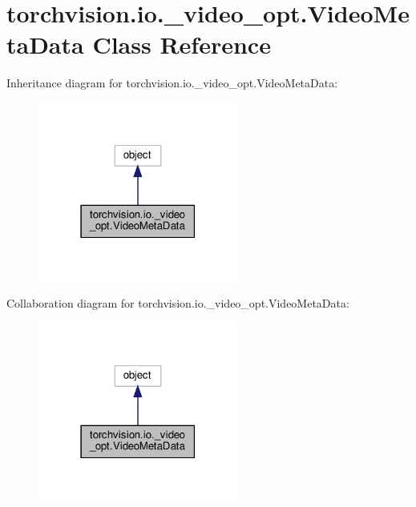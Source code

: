 \hypertarget{classtorchvision_1_1io_1_1__video__opt_1_1VideoMetaData}{}\section{torchvision.\+io.\+\_\+video\+\_\+opt.\+Video\+Meta\+Data Class Reference}
\label{classtorchvision_1_1io_1_1__video__opt_1_1VideoMetaData}


Inheritance diagram for torchvision.\+io.\+\_\+video\+\_\+opt.\+Video\+Meta\+Data\+:
\nopagebreak
\begin{figure}[H]
\begin{center}
\leavevmode
\includegraphics[width=186pt]{classtorchvision_1_1io_1_1__video__opt_1_1VideoMetaData__inherit__graph}
\end{center}
\end{figure}


Collaboration diagram for torchvision.\+io.\+\_\+video\+\_\+opt.\+Video\+Meta\+Data\+:
\nopagebreak
\begin{figure}[H]
\begin{center}
\leavevmode
\includegraphics[width=186pt]{classtorchvision_1_1io_1_1__video__opt_1_1VideoMetaData__coll__graph}
\end{center}
\end{figure}
